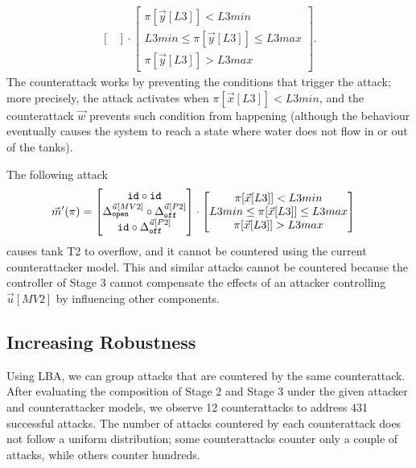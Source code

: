 {\begin{align*}
\begin{bmatrix}
  \end{bmatrix}
  \cdot
  \begin{bmatrix}
    \pi[\vec{y}[L3]]<L3min \\
    L3min \leq \pi[\vec{y}[L3]]\leq L3max \\
    \pi[\vec{y}[L3]]>L3max
  \end{bmatrix}.
\end{align*} 
The counterattack works by preventing the conditions that trigger the attack; more precisely, the attack activates when $\pi[\vec{x}[L3]]<L3min$, and the counterattack $\vec{w}$ prevents such condition from happening (although the behaviour eventually causes the system to reach a state where water does not flow in or out of the tanks). 

The following attack
\begin{align*}
    \vec{m}'(\pi)&=
    \begin{bmatrix}
     {\texttt{id}}\circ {\texttt{id}} \\
     {\Delta}^{\vec{u}[MV2]}_{\texttt{open}}\circ {\Delta}^{\vec{u}[P2]}_{\texttt{off}} \\
     {\texttt{id}}\circ {\Delta}^{\vec{u}[P2]}_{\texttt{off}} \\
    \end{bmatrix}
    \cdot
    \begin{bmatrix}
      \pi[\vec{x}[L3]]<L3min \\
      L3min \leq \pi[\vec{x}[L3]]\leq L3max \\
      \pi[\vec{x}[L3]]>L3max
    \end{bmatrix}
  \end{align*} 
causes tank T2 to overflow, and it cannot be countered using the current counterattacker model. This and similar attacks cannot be countered because the controller of Stage 3 cannot compensate the effects of an attacker controlling $\vec{u}[MV2]$ by influencing other components. 

\subsection{Increasing Robustness}
Using LBA, we can group attacks that are countered by the same counterattack. After evaluating the composition of Stage 2 and Stage 3 under the given attacker and counterattacker models, we observe 12 counterattacks to address 431 successful attacks. The number of attacks countered by each counterattack does not follow a uniform distribution; some counterattacks counter only a couple of attacks, while others counter hundreds. 

}

